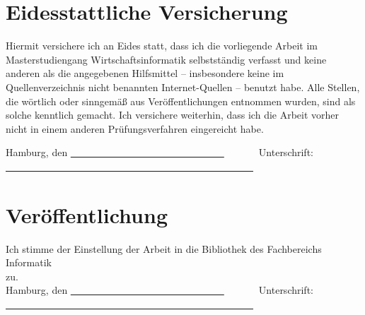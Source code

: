 	\chapter*{Eidesstattliche Versicherung}
\renewcommand*\chapterpagestyle{empty}
Hiermit versichere ich an Eides statt, dass ich die vorliegende Arbeit im Masterstudiengang Wirtschaftsinformatik
selbstständig verfasst und keine anderen als die angegebenen Hilfsmittel – insbesondere keine im Quellenverzeichnis nicht benannten Internet-Quellen – benutzt habe.
Alle Stellen, die wörtlich oder sinngemäß aus Veröffentlichungen entnommen wurden, sind als solche kenntlich gemacht. 
Ich versichere weiterhin, dass ich die Arbeit vorher nicht in einem anderen Prüfungsverfahren eingereicht habe.
\vspace{1cm}

\noindent Hamburg, den \uline{~~~~~~~~~~~~~~~~~~~~~~~~~~~~~~~}~~~~~~~Unterschrift: \uline{~~~~~~~~~~~~~~~~~~~~~~~~~~~~~~~~~~~~~~~~~~~~~~~~~~} 

\let \cleardoublepage \clearpage

\noindent\begin{minipage}{\textwidth}
	
\vspace{1cm} 
\chapter*{Veröffentlichung}
Ich stimme der Einstellung der Arbeit in die Bibliothek des Fachbereichs Informatik \\zu.
\vspace{1cm}\\ 
\noindent Hamburg, den \uline{~~~~~~~~~~~~~~~~~~~~~~~~~~~~~~~}~~~~~~~Unterschrift: \uline{~~~~~~~~~~~~~~~~~~~~~~~~~~~~~~~~~~~~~~~~~~~~~~~~~~}
\end{minipage}
